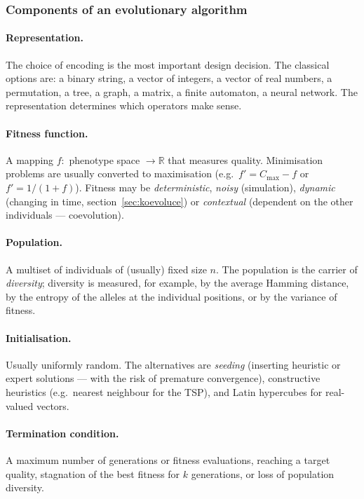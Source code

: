 \documentclass[11pt,a4paper]{article}
\theoremstyle{definition}
\begin{document}
\subsubsection{Components of an evolutionary algorithm}

\paragraph{Representation.} The choice of encoding is the most important design
decision. The classical options are: a binary string, a vector of integers, a
vector of real numbers, a permutation, a tree, a graph, a matrix, a finite
automaton, a neural network. The representation determines which operators make
sense.

\paragraph{Fitness function.} A mapping $f:$ phenotype space $\to \mathbb{R}$
that measures quality. Minimisation problems are usually converted to
maximisation (e.g.\ $f' = C_{\max} - f$ or $f' = 1/(1+f)$). Fitness may be
\emph{deterministic}, \emph{noisy} (simulation), \emph{dynamic} (changing in
time, section~\ref{sec:koevoluce}) or \emph{contextual} (dependent on the other
individuals --- coevolution).

\paragraph{Population.} A multiset of individuals of (usually) fixed size $n$.
The population is the carrier of \emph{diversity}; diversity is measured, for
example, by the average Hamming distance, by the entropy of the alleles at the
individual positions, or by the variance of fitness.

\paragraph{Initialisation.} Usually uniformly random. The alternatives are
\emph{seeding} (inserting heuristic or expert solutions --- with the risk of
premature convergence), constructive heuristics (e.g.\ nearest neighbour for the
TSP), and Latin hypercubes for real-valued vectors.

\paragraph{Termination condition.} A maximum number of generations or fitness
evaluations, reaching a target quality, stagnation of the best fitness for $k$
generations, or loss of population diversity.
\end{document}
